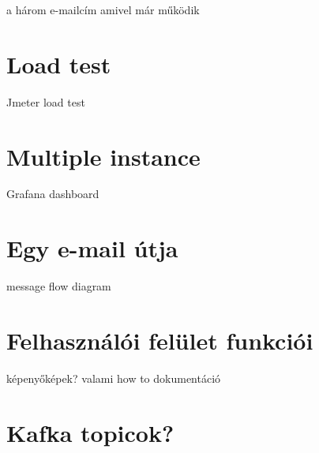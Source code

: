 a három e-mailcím amivel már működik

\section{Load test}
Jmeter load test

\section{Multiple instance}
Grafana dashboard

\section{Egy e-mail útja}
message flow diagram

\section{Felhasználói felület funkciói}
 képenyőképek? valami how to dokumentáció

\section{Kafka topicok?}